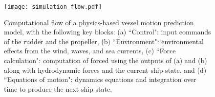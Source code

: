 



\begin{figure}[t]
    \texttt{[image: simulation\_flow.pdf]} 
    \vspace{-8mm}
    \caption{Computational flow of a physics-based vessel motion prediction model, with the following key blocks: (a) ``Control": input commands of the rudder and the propeller, (b) ``Environment": environmental effects from the wind, waves, and sea currents, (c) ``Force calculation": computation of forced using the outputs of (a) and (b) along with hydrodynamic forces and the current ship state, and (d) ``Equations of motion": dynamics equations and integration over time to produce the next ship state.}
    \label{fig:simulation_system}
    \vspace{-3mm}
\end{figure}